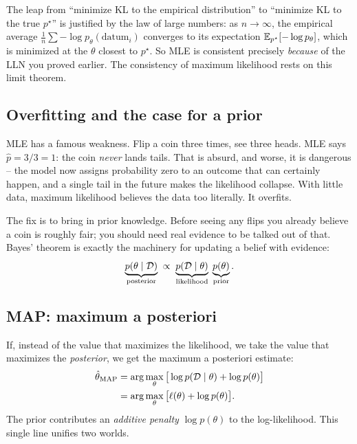 \begin{connectionbox}
The leap from ``minimize KL to the empirical distribution'' to ``minimize KL to
the true $p^\star$'' is justified by the law of large numbers: as $n\to\infty$,
the empirical average $\frac1n\sum -\log p_\theta(\text{datum}_i)$ converges to
its expectation $\operatorname{\mathbb{E}}_{p^\star}[-\log p_\theta]$, which is minimized at the
$\theta$ closest to $p^\star$. So MLE is consistent precisely \emph{because} of
the LLN you proved earlier. The consistency of maximum likelihood rests on this limit theorem.
\end{connectionbox}

\subsection{Overfitting and the case for a prior}

MLE has a famous weakness. Flip a coin three times, see three heads. MLE says
$\hat p = 3/3 = 1$: the coin \emph{never} lands tails. That is absurd, and worse,
it is dangerous -- the model now assigns probability zero to an outcome that can
certainly happen, and a single tail in the future makes the likelihood collapse.
With little data, maximum likelihood believes the data too literally. It
overfits.

The fix is to bring in prior knowledge. Before seeing any flips you already
believe a coin is roughly fair; you should need real evidence to be talked out of
that. Bayes' theorem is exactly the machinery for updating a belief with
evidence:
\[
  \underbrace{p(\theta\mid\mathcal{D})}_{\text{posterior}}
  \;\propto\;
  \underbrace{p(\mathcal{D}\mid\theta)}_{\text{likelihood}}\;
  \underbrace{p(\theta)}_{\text{prior}}.
\]

\subsection{MAP: maximum a posteriori}

If, instead of the value that maximizes the likelihood, we take the value that
maximizes the \emph{posterior}, we get the maximum a posteriori estimate:
\begin{align*}
  \hat\theta_{\text{MAP}}
  &= \arg\max_\theta \big[\log p(\mathcal{D}\mid\theta) + \log p(\theta)\big] \\
  &= \arg\max_\theta \big[\ell(\theta) + \log p(\theta)\big].
\end{align*}
The prior contributes an \emph{additive penalty} $\log p(\theta)$ to the
log-likelihood. This single line unifies two worlds.

